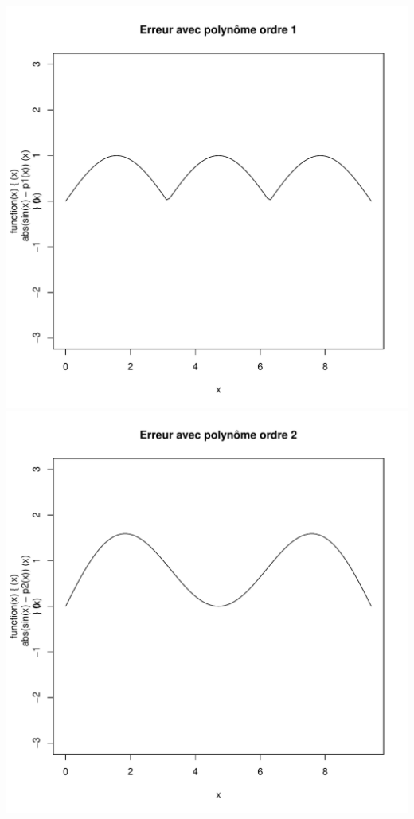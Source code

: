 \documentclass[10pt]{article}
\begin{document}
\includegraphics[scale=0.4]{data/p1}
\includegraphics[scale=0.4]{data/p2}
\end{document}
